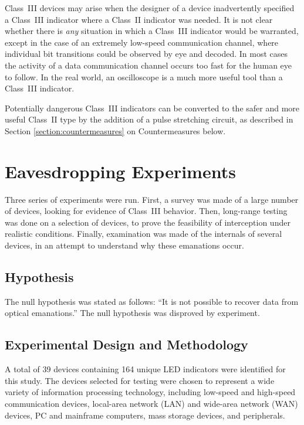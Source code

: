 \documentclass{acmtrans2e}
\begin{document}
Class~III devices may arise when the designer of a device inadvertently 
specified a Class~III indicator where a Class~II indicator was needed.
It is not clear whether 
there is {\it any} situation in which a Class~III indicator would be 
warranted, except in the case of an extremely low-speed communication 
channel, where individual bit transitions could be observed by eye and 
decoded.  In most cases the activity of a data communication channel 
occurs too fast for the human eye to follow.  In the real world, an 
oscilloscope is a much more useful tool than a Class~III indicator.

Potentially dangerous Class~III indicators can be converted to the safer 
and more useful Class~II type by the addition of a pulse stretching circuit,
as described in Section \ref{section:countermeasures}
on Countermeasures below.

\section{Eavesdropping Experiments}

Three series of experiments were run.  First, a survey was made of a 
large number of devices, looking for evidence of Class~III behavior.  
Then, long-range testing was done on a selection of devices, to prove the 
feasibility of interception under realistic conditions.  Finally, 
examination was made of the internals of several devices, in an attempt 
to understand why these emanations occur.

\subsection{Hypothesis}

The null hypothesis was stated as follows: ``It is not possible to recover
data from optical emanations.''  The null hypothesis was disproved
by experiment.
 
\subsection{Experimental Design and Methodology}

A total of 39 devices containing 164 unique LED indicators were 
identified for this study.  The devices selected for testing were chosen 
to represent a wide variety of information processing technology, 
including low-speed and high-speed communication devices, local-area 
network (LAN) and wide-area network (WAN) devices, PC and mainframe 
computers, mass storage devices, and peripherals.
\end{document}
